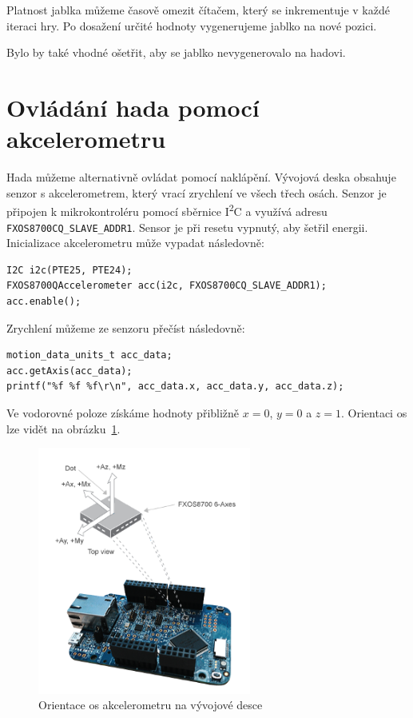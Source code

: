 \documentclass[12pt]{article}
\newcommand{\twi}{I\textsuperscript{2}C}
\begin{document}
Platnost jablka můžeme časově omezit čítačem, který se inkrementuje v každé iteraci hry.
Po dosažení určité hodnoty vygenerujeme jablko na nové pozici.

Bylo by také vhodné ošetřit, aby se jablko nevygenerovalo na hadovi.

\section{Ovládání hada pomocí akcelerometru}
Hada můžeme alternativně ovládat pomocí naklápění.
Vývojová deska obsahuje senzor s akcelerometrem, který vrací zrychlení ve všech třech osách.
Senzor je připojen k mikrokontroléru pomocí sběrnice \twi{} a využívá adresu \texttt{FXOS8700CQ\_SLAVE\_ADDR1}.
Sensor je při resetu vypnutý, aby šetřil energii.
Inicializace akcelerometru může vypadat následovně:
\begin{verbatim}
I2C i2c(PTE25, PTE24);
FXOS8700QAccelerometer acc(i2c, FXOS8700CQ_SLAVE_ADDR1);
acc.enable();
\end{verbatim}

Zrychlení můžeme ze senzoru přečíst následovně:
\begin{verbatim}
motion_data_units_t acc_data;
acc.getAxis(acc_data);
printf("%f %f %f\r\n", acc_data.x, acc_data.y, acc_data.z);
\end{verbatim}
Ve vodorovné poloze získáme hodnoty přibližně $ x = 0$, $y = 0$ a $z = 1 $.
Orientaci os lze vidět na obrázku~\ref{fig:axes}.

\begin{figure}[ht]
  \centering
  \includegraphics[width=7cm]{figures/axis}
  \caption[]{Orientace os akcelerometru na vývojové desce\footnotemark}
  \label{fig:axes}
\end{figure}
\end{document}
